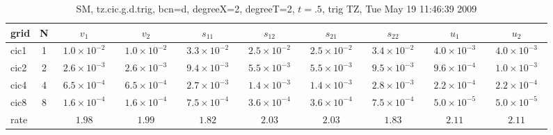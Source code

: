 \begin{table}[hbt]\tableFont %
\begin{center}
\begin{tabular}{|l|c|c|c|c|c|c|c|c|c|} \hline\hline 
grid  & N  & $v_1$ & $v_2$ & $s_{11}$ & $s_{12}$ & $s_{21}$ & $s_{22}$ &  $u_1$ & $u_2$\\ \hline 
                cic1 &     1 & ~$1.0\times10^{ -2}$~ & ~$1.0\times10^{ -2}$~ & ~$3.3\times10^{ -2}$~ & ~$2.5\times10^{ -2}$~ & ~$2.5\times10^{ -2}$~ & ~$3.4\times10^{ -2}$~ & ~$4.0\times10^{ -3}$~ & ~$4.0\times10^{ -3}$~  \\ \hline
                cic2 &     2 & ~$2.6\times10^{ -3}$~ & ~$2.6\times10^{ -3}$~ & ~$9.4\times10^{ -3}$~ & ~$5.5\times10^{ -3}$~ & ~$5.5\times10^{ -3}$~ & ~$9.5\times10^{ -3}$~ & ~$9.6\times10^{ -4}$~ & ~$1.0\times10^{ -3}$~  \\ \hline
                cic4 &     4 & ~$6.5\times10^{ -4}$~ & ~$6.5\times10^{ -4}$~ & ~$2.7\times10^{ -3}$~ & ~$1.4\times10^{ -3}$~ & ~$1.4\times10^{ -3}$~ & ~$2.8\times10^{ -3}$~ & ~$2.2\times10^{ -4}$~ & ~$2.2\times10^{ -4}$~  \\ \hline
                cic8 &     8 & ~$1.6\times10^{ -4}$~ & ~$1.6\times10^{ -4}$~ & ~$7.5\times10^{ -4}$~ & ~$3.6\times10^{ -4}$~ & ~$3.6\times10^{ -4}$~ & ~$7.5\times10^{ -4}$~ & ~$5.0\times10^{ -5}$~ & ~$5.0\times10^{ -5}$~  \\ \hline
    rate             &       &       $1.98$          &       $1.99$          &       $1.82$          &       $2.03$          &       $2.03$          &       $1.83$          &       $2.11$          &       $2.11$           \\ \hline\hline
\end{tabular}
\caption{SM, tz.cic.g.d.trig, bcn=d, degreeX=2, degreeT=2, $t=.5$, trig TZ, Tue May 19 11:46:39 2009}\label{table:tz.cic.g.d.trig}
\end{center}
\end{table}
